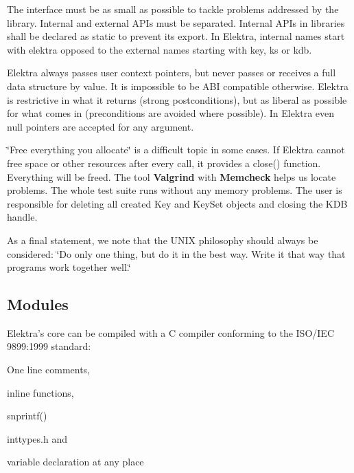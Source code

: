 The interface must be as small as possible to tackle problems addressed by the library. Internal and external A\+P\+Is must be separated. Internal A\+P\+Is in libraries shall be declared as {\ttfamily static} to prevent its export. In Elektra, internal names start with {\ttfamily elektra} opposed to the external names starting with {\ttfamily key}, {\ttfamily ks} or {\ttfamily kdb}.

Elektra always passes user context pointers, but never passes or receives a full data structure by value. It is impossible to be A\+B\+I compatible otherwise. Elektra is restrictive in what it returns (strong postconditions), but as liberal as possible for what comes in (preconditions are avoided where possible). In Elektra even null pointers are accepted for any argument.

\char`\"{}\+Free everything you allocate\char`\"{} is a difficult topic in some cases. If Elektra cannot free space or other resources after every call, it provides a {\ttfamily close()} function. Everything will be freed. The tool {\bfseries Valgrind} with {\bfseries Memcheck} helps us locate problems. The whole test suite runs without any memory problems. The user is responsible for deleting all created {\ttfamily Key} and {\ttfamily Key\+Set} objects and closing the {\ttfamily K\+D\+B} handle.

As a final statement, we note that the U\+N\+I\+X philosophy should always be considered\+: \char`\"{}\+Do only one thing, but do it in the best way. Write it
that way that programs work together well.\char`\"{}

\subsection*{Modules}

Elektra's core can be compiled with a C compiler conforming to the I\+S\+O/\+I\+E\+C 9899\+:1999 standard\+:


\begin{DoxyItemize}
\item One line comments,
\item inline functions,
\item {\ttfamily snprintf()}
\item inttypes.\+h and
\item variable declaration at any place
\end{DoxyItemize}

